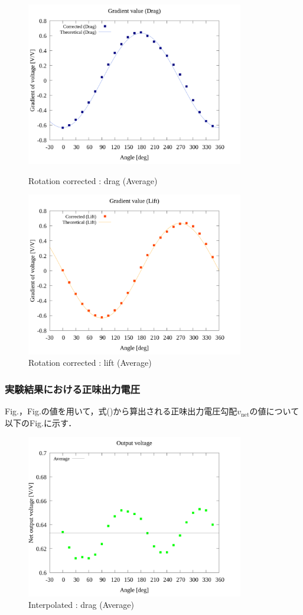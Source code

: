 \begin{figure}[htbp]
		\centering
		\includegraphics[width=95mm]{../../02_workspace/result/2-ex/plot/21/21-4_corrected_angle_drag.png}
		\caption{Rotation corrected : drag (Average)}
		\includegraphics[width=95mm]{../../02_workspace/result/2-ex/plot/21/21-4_corrected_angle_lift.png}
		\caption{Rotation corrected : lift (Average)}
\end{figure}

\newpage

\subsubsection{実験結果における正味出力電圧}
Fig.，Fig.の値を用いて，式()から算出される正味出力電圧勾配$v_{\mathrm{net}}$の値について
以下のFig.に示す．

\begin{figure}[htbp]
  \centering
  \includegraphics[width=95mm]{../../02_workspace/result/2-ex/plot/09/09_summary-outputvoltage-net.png}
  \caption{Interpolated : drag (Average)}
\end{figure}

